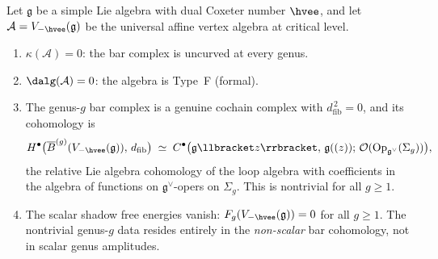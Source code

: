 \documentclass[11pt]{article}
\newcommand{\cA}{\mathcal{A}}
\newcommand{\cO}{\mathcal{O}}
\newcommand{\fg}{\mathfrak{g}}
\newcommand{\barB}{\overline{B}}
\newcommand{\dfib}{d_{\mathrm{fib}}}
\begin{document}
\begin{theorem}
\label{thm:critical-level-nontrivial}
Let $\fg$ be a simple Lie algebra with dual Coxeter number
$\hvee$, and let $\cA = V_{-\hvee}(\fg)$ be the universal
affine vertex algebra at critical level.
\begin{enumerate}[label=\textup{(\roman*)}]
\item $\kappa(\cA) = 0$: the bar complex is uncurved at
  every genus.
\item $\dalg(\cA) = 0$: the algebra is Type~F (formal).
\item The genus-$g$ bar complex is a genuine cochain complex
  with $\dfib^{\,2} = 0$, and its cohomology is
  \[
  H^\bullet\bigl(\barB^{(g)}(V_{-\hvee}(\fg)),\, \dfib\bigr)
  \;\simeq\;
  C^\bullet\bigl(\fg\llbracket z \rrbracket,\,
  \fg((z));\, \cO(\mathrm{Op}_{\fg^\vee}(\Sigma_g))\bigr),
  \]
  the relative Lie algebra cohomology of the loop algebra
  with coefficients in the algebra of functions on
  $\fg^\vee$-opers on $\Sigma_g$.  This is nontrivial for
  all $g \geq 1$.
\item The scalar shadow free energies vanish:
  $F_g(V_{-\hvee}(\fg)) = 0$ for all $g \geq 1$.
  The nontrivial genus-$g$ data resides entirely in the
  \emph{non-scalar} bar cohomology, not in scalar genus
  amplitudes.
\end{enumerate}
\end{theorem}
\end{document}
